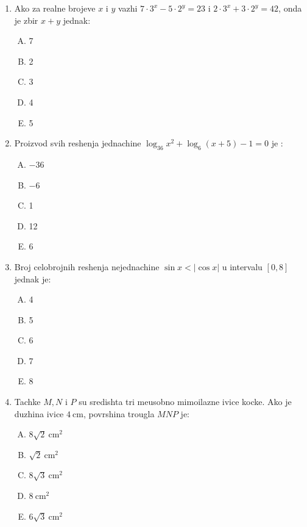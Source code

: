 \documentclass[a4paper,12pt]{article}
\newcommand{\Lat}{\fontencoding{OT1}\selectfont}
\begin{document}
\begin{enumerate}[1.]
\item Ako za realne brojeve $x$  i $y$ vazhi $7 \cdot 3^{x} - 5 \cdot 2^{y} = 23$ i $2 \cdot 3^{x} + 3 \cdot 2^{y} = 42$, onda je zbir $x + y$ jednak:
{\Lat
\begin{multicols}{5}
\begin{enumerate}[A)]
\item 7 \item 2 \item 3 \item 4 \item 5
\end{enumerate}
\end{multicols}
}


\item Proizvod svih reshenja jednachine $ \log_{36} x^{2} + \log_6 (x + 5) -1 = 0$ je :
{\Lat
\begin{multicols}{5}
\begin{enumerate}[A)]
\item $-36$ \item $-6$ \item 1 \item 12 \item 6
\end{enumerate}
\end{multicols}
}


\item Broj celobrojnih reshenja nejednachine $\sin{x} < \lvert \cos{x} \rvert $ u intervalu $[ 0,8] $ jednak je: 
{\Lat
\begin{multicols}{5}
\begin{enumerate}[A)]
\item 4 \item 5 \item 6 \item 7 \item 8
\end{enumerate}
\end{multicols}
}

\item Tachke $M,N$ i $P$ su sredishta tri me\dj{}usobno mimoilazne ivice kocke. Ako je duzhina ivice $4\mathrm{\ cm}$, povrshina trougla $MNP$ je:
{\Lat
\begin{multicols}{5}
\begin{enumerate}[A)]
\item $8\sqrt{2}\mathrm{\ cm}^2$ \item $\sqrt{2}\mathrm{\ cm}^2$ \item $8\sqrt{3}\mathrm{\ cm}^2$ \item $8\mathrm{\ cm}^2$ \item $6\sqrt{3}\mathrm{\ cm}^2$
\end{enumerate}
\end{multicols}
}


\end{enumerate}
\end{document}

